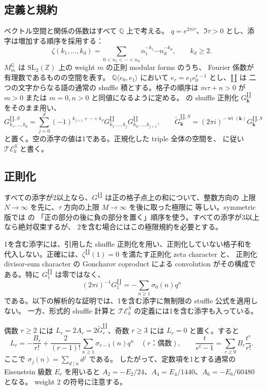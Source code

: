 \documentclass[12pt]{amsart}
\theoremstyle{definition}
\theoremstyle{remark}
\numberwithin{equation}{section}
\newcommand{\Z}{\mathbb{Z}}
\newcommand{\Q}{\mathbb{Q}}
\newcommand{\sh}{\mathbin{\amalg}}
\newcommand{\sG}[1]{\widetilde G^{\sh,S}_{#1}}
\newcommand{\SG}[1]{G^{\sh,S}_{#1}}
\newcommand{\wt}{\operatorname{wt}}
\numberwithin{equation}{section}
\begin{document}
\subsection{定義と規約}
ベクトル空間と関係の係数はすべて $\Q$ 上で考える。
$q=e^{2\pi i\tau}$、$\Im\tau>0$ とし、添字は増加する順序を採用する：
\[
 \zeta(k_1,\ldots,k_d)=\sum_{0<n_1<\cdots<n_d}
 n_1^{-k_1}\cdots n_d^{-k_d},\qquad k_d\ge2.
\]
$M_m^{\Q}$ は $\mathrm{SL}_2(\Z)$ 上の weight $m$ の正則 modular forms のうち、
Fourier 係数が有理数であるものの空間を表す。
$\Q\langle e_0,e_1\rangle$ において $e_r=e_1e_0^{r-1}$ とし、$\sh$ は
二つの文字からなる語の通常の shuffle 積とする。格子の順序は
$m\tau+n>0$ が $m>0$ または $m=0,n>0$ と同値になるように定める。
\cite[Theorem 2.7]{j-hst} の shuffle 正則化 $G_{\boldsymbol k}^{\sh}$ をそのまま用い、
\begin{equation}\label{j:def}
 \SG{k_1,\ldots,k_d}
 =\sum_{j=0}^d(-1)^{k_{j+1}+\cdots+k_d}
   G_{k_1,\ldots,k_j}^{\sh}G_{k_d,\ldots,k_{j+1}}^{\sh},
 \qquad \sG{\boldsymbol k}=(2\pi i)^{-\wt(\boldsymbol k)}\SG{\boldsymbol k}
\end{equation}
と置く。空の添字の値は1である。正規化した triple 全体の空間を、
\cite[\S6.3]{j-hst} に従い $\mathcal{TE}_k^S$ と書く。

\subsection{正則化}
すべての添字が2以上なら、$G^{\sh}$ は正の格子点上の和について、整数方向の
上限 $N\to\infty$ を先に、$\tau$ 方向の上限 $M\to\infty$ を後に取った極限に
等しい。symmetric 版では \cite[Definition 3.6, Proposition 3.7]{j-hst} の
「正の部分の後に負の部分を置く」順序を使う。すべての添字が3以上なら絶対収束するが、
2を含む場合にはこの極限規約を必要とする。

1を含む添字には、引用した shuffle 正則化を用い、正則化していない格子和を
代入しない。正確には、$\zeta^{\sh}(1)=0$ を満たす正則化 zeta character と、
正則化 divisor-sum character の Goncharov coproduct による convolution
がその構成である。特に $G^{\sh}_1$ は零ではなく、
\[
 (2\pi i)^{-1}G^{\sh}_1=-\sum_{n\ge1}\sigma_0(n)q^n
\]
である。以下の解析的な証明では、1を含む添字に無制限の stuffle 公式を適用しない。
一方、形式的 shuffle 計算と $\mathcal{TE}_k^S$ の定義には1を含む添字も入っている。

偶数 $r\ge2$ には $L_r=2A_r=2\widetilde G_r^{\sh}$、奇数 $r\ge3$ には
$L_r=0$ と置く。すると
\begin{equation}\label{j:fourier}
 L_r=-\frac{B_r}{r!}+\frac{2}{(r-1)!}\sum_{n\ge1}\sigma_{r-1}(n)q^n
 \quad(r\text{：偶数}),\qquad
 \frac{t}{e^t-1}=\sum_{r\ge0}B_r\frac{t^r}{r!}.
\end{equation}
ここで $\sigma_j(n)=\sum_{d\mid n}d^j$ である。
したがって、定数項を1とする通常の Eisenstein 級数 $E_r$ を用いると
$A_2=-E_2/24$、$A_4=E_4/1440$、$A_6=-E_6/60480$ となる。
weight 2 の符号に注意する。
\end{document}
